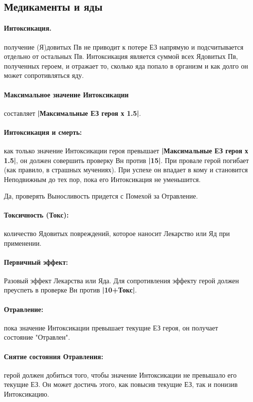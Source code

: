 \subsection{Медикаменты и яды}
\paragraph{Интоксикация.} получение (Я)довитых Пв не приводит к потере ЕЗ напрямую и подсчитывается отдельно от остальных Пв. Интоксикация является суммой всех Ядовитых Пв, полученных героем, и отражает то, сколько яда попало в организм и как долго он может сопротивляться яду.
\paragraph{Максимальное значение Интоксикации} составляет \textbf{|Максимальные ЕЗ героя х 1.5|}. 
\paragraph{Интоксикация и смерть:} как только значение Интоксикации героя превышает \textbf{|Максимальные ЕЗ героя х 1.5|}, он должен совершить проверку Вн против \textbf{|15|}. При провале герой погибает (как правило, в страшных мучениях). При успехе он впадает в кому и становится Неподвижным до тех пор, пока его Интоксикация не уменьшится.
\begin{tcolorbox}
    Да, проверять Выносливость придется с Помехой за Отравление.
\end{tcolorbox}
\paragraph{Токсичность (Токс):} количество Ядовитых повреждений, которое наносит Лекарство или Яд при применении.
\paragraph{Первичный эффект:} Разовый эффект Лекарства или Яда. Для сопротивления эффекту герой должен преуспеть в проверке Вн против \textbf{|10+Токс|}.
\paragraph{Отравление:} пока значение Интоксикации превышает текущие ЕЗ героя, он получает состояние "Отравлен". 
\paragraph{Снятие состояния Отравления:} герой должен добиться того, чтобы значение Интоксикации не превышало его текущие ЕЗ. Он может достичь этого, как повысив текущие ЕЗ, так и понизив Интоксикацию.
